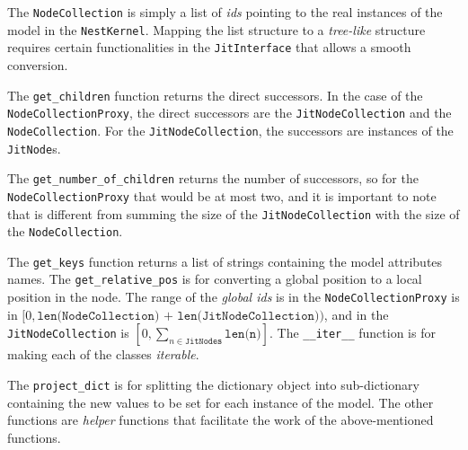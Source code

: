 The \texttt{NodeCollection} is simply a list of \emph{ids} pointing to the real instances of the model in the \texttt{NestKernel}. Mapping the list structure to a \emph{tree-like} structure requires certain functionalities in the \texttt{JitInterface} that allows a smooth conversion.

The \texttt{get\_children} function returns the direct successors. In the case of the \texttt{NodeCollectionProxy}, the direct successors are the \texttt{JitNodeCollection} and the \texttt{NodeCollection}. For the \texttt{JitNodeCollection}, the successors are instances of the \texttt{JitNode}s.

The \texttt{get\_number\_of\_children} returns the number of successors, so for the \texttt{NodeCollectionProxy} that would be at most two, and it is important to note that is different from summing the size of the \texttt{JitNodeCollection} with the size of the \texttt{NodeCollection}. 

The \texttt{get\_keys} function returns a list of strings containing the model attributes names. The \texttt{get\_relative\_pos} is for converting a global position to a local position in the node. The range of the \emph{global ids} is in the \texttt{NodeCollectionProxy} is in $[0, \texttt{len(NodeCollection) + len(JitNodeCollection)})$, and in the \texttt{JitNodeCollection} is $[0,\sum_{n \in \texttt{JitNodes}} \texttt{len(n)}]$. The \texttt{\_\_iter\_\_} function is for making each of the classes \emph{iterable}. 

The \texttt{project\_dict} is for splitting the dictionary object into sub-dictionary containing the new values to be set for each instance of the model. The other functions are \emph{helper} functions that facilitate the work of the above-mentioned functions.



